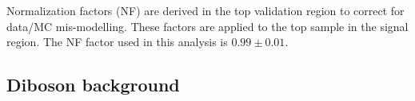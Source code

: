 %
%
%


Normalization factors (NF) are derived in the top validation region to correct for data/MC mis-modelling. These factors are applied to the top sample in the signal region. The NF factor used in this analysis is $0.99\pm0.01$. 

\subsection{Diboson background}

